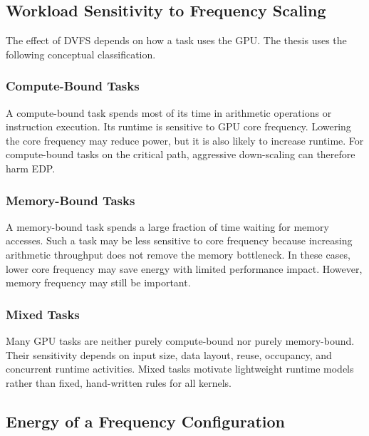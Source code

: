\subsection{Workload Sensitivity to Frequency Scaling}
\label{subsec:workload_sensitivity}

The effect of DVFS depends on how a task uses the GPU. The thesis uses the following conceptual classification.

\subsubsection{Compute-Bound Tasks}
\label{subsubsec:compute_bound}

A compute-bound task spends most of its time in arithmetic operations or instruction execution. Its runtime is sensitive to GPU core frequency. Lowering the core frequency may reduce power, but it is also likely to increase runtime. For compute-bound tasks on the critical path, aggressive down-scaling can therefore harm EDP.

\subsubsection{Memory-Bound Tasks}
\label{subsubsec:memory_bound}

A memory-bound task spends a large fraction of time waiting for memory accesses. Such a task may be less sensitive to core frequency because increasing arithmetic throughput does not remove the memory bottleneck. In these cases, lower core frequency may save energy with limited performance impact. However, memory frequency may still be important.

\subsubsection{Mixed Tasks}
\label{subsubsec:mixed_tasks}

Many GPU tasks are neither purely compute-bound nor purely memory-bound. Their sensitivity depends on input size, data layout, reuse, occupancy, and concurrent runtime activities. Mixed tasks motivate lightweight runtime models rather than fixed, hand-written rules for all kernels.

\subsection{Energy of a Frequency Configuration}
\label{subsec:energy_frequency_config}

